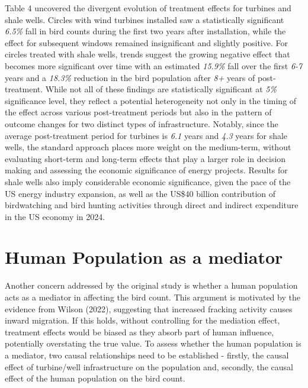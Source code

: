 \documentclass{article}
\begin{document}
\addlinespace

Table 4 uncovered the divergent evolution of treatment effects for turbines and shale wells. Circles with wind turbines installed saw a statistically significant \textit{6.5\%} fall in bird counts during the first two years after installation, while the effect for subsequent windows remained insignificant and slightly positive. For circles treated with shale wells, trends suggest the growing negative effect that becomes more significant over time with an estimated \textit{15.9\%} fall over the first \textit{6-7} years and a \textit{18.3\%} reduction in the bird population after \textit{8+} years of post-treatment. While not all of these findings are statistically significant at \textit{5\%} significance level, they reflect a potential heterogeneity not only in the timing of the effect across various post-treatment periods but also in the pattern of outcome changes for two distinct types of infrastructure. Notably, since the average post-treatment period for turbines is \textit{6.1} years and \textit{4.3} years for shale wells, the standard approach places more weight on the medium-term, without evaluating short-term and long-term effects that play a larger role in decision making and assessing the economic significance of energy projects. Results for shale wells also imply considerable economic significance, given the pace of the US energy industry expansion, as well as the US\$40 billion contribution of birdwatching and bird hunting activities through direct and indirect expenditure in the US economy in 2024.




\section{Human Population as a mediator}

Another concern addressed by the original study is whether a human population acts as a mediator in affecting the bird count. This argument is motivated by the evidence from Wilson (2022), suggesting that increased fracking activity causes inward migration. If this holds, without controlling for the mediation effect, treatment effects would be biased as they absorb part of human influence, potentially overstating the true value. To assess whether the human population is a mediator, two causal relationships need to be established - firstly, the causal effect of turbine/well infrastructure on the population and, secondly, the causal effect of the human population on the bird count. 
\end{document}
